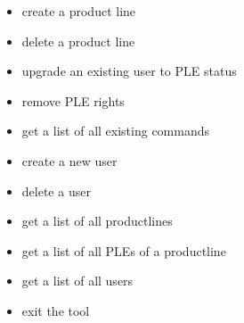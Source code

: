 \begin{itemize}
	\item create a product line
	\item delete a product line
	\item upgrade an existing user to PLE status
	\item remove PLE rights
	\item get a list of all existing commands
	\item create a new user
	\item delete a user
	\item get a list of all productlines
	\item get a list of all PLEs of a productline
	\item get a list of all users
	\item exit the tool
\end{itemize}

